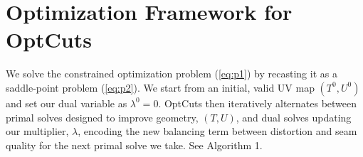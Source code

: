 
\section{Optimization Framework for OptCuts}

We solve the constrained optimization problem (\ref{eq:p1}) by recasting it as a saddle-point problem (\ref{eq:p2}). 
We start from an initial, valid UV map $(T^0, U^0)$ and set our dual variable as $\lambda^0 = 0$. OptCuts then iteratively alternates between primal solves designed to improve geometry, $(T, U)$, and dual solves updating our multiplier, $\lambda$,  encoding the new balancing term between distortion and seam quality for the next primal solve we take. See Algorithm 1.

%
%
%
%
%

%
%


